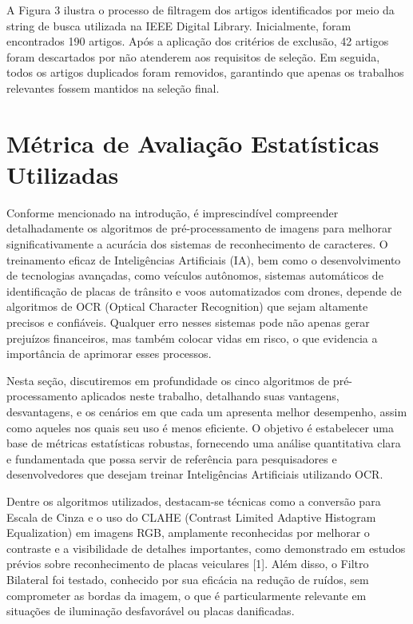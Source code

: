 \documentclass[conference]{IEEEtran}
\begin{document}
A Figura 3 ilustra o processo de filtragem dos artigos identificados por meio da string de busca utilizada na IEEE Digital Library. Inicialmente, foram encontrados 190 artigos. Após a aplicação dos critérios de exclusão, 42 artigos foram descartados por não atenderem aos requisitos de seleção. Em seguida, todos os artigos duplicados foram removidos, garantindo que apenas os trabalhos relevantes fossem mantidos na seleção final.

\section{Métrica de Avaliação Estatísticas Utilizadas}

Conforme mencionado na introdução, é imprescindível compreender detalhadamente os algoritmos de pré-processamento de imagens para melhorar significativamente a acurácia dos sistemas de reconhecimento de caracteres. O treinamento eficaz de Inteligências Artificiais (IA), bem como o desenvolvimento de tecnologias avançadas, como veículos autônomos, sistemas automáticos de identificação de placas de trânsito e voos automatizados com drones, depende de algoritmos de OCR (Optical Character Recognition) que sejam altamente precisos e confiáveis. Qualquer erro nesses sistemas pode não apenas gerar prejuízos financeiros, mas também colocar vidas em risco, o que evidencia a importância de aprimorar esses processos.

Nesta seção, discutiremos em profundidade os cinco algoritmos de pré-processamento aplicados neste trabalho, detalhando suas vantagens, desvantagens, e os cenários em que cada um apresenta melhor desempenho, assim como aqueles nos quais seu uso é menos eficiente. O objetivo é estabelecer uma base de métricas estatísticas robustas, fornecendo uma análise quantitativa clara e fundamentada que possa servir de referência para pesquisadores e desenvolvedores que desejam treinar Inteligências Artificiais utilizando OCR.

Dentre os algoritmos utilizados, destacam-se técnicas como a conversão para Escala de Cinza e o uso do CLAHE (Contrast Limited Adaptive Histogram Equalization) em imagens RGB, amplamente reconhecidas por melhorar o contraste e a visibilidade de detalhes importantes, como demonstrado em estudos prévios sobre reconhecimento de placas veiculares [1]. Além disso, o Filtro Bilateral foi testado, conhecido por sua eficácia na redução de ruídos, sem comprometer as bordas da imagem, o que é particularmente relevante em situações de iluminação desfavorável ou placas danificadas.
\end{document}
